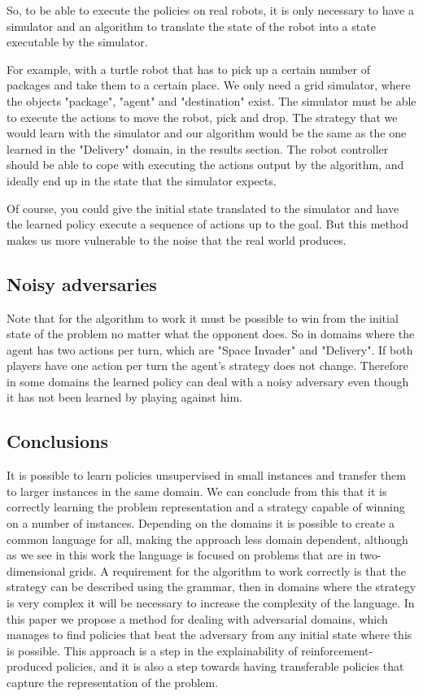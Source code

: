 \documentclass[a4paper]{article}
\begin{document}
So, to be able to execute the policies on real robots, it is only necessary to have a simulator and an algorithm to translate the state of the robot into a state executable by the simulator.

For example, with a turtle robot that has to pick up a certain number of packages and take them to a certain place. We only need a grid simulator, where the objects "package", "agent" and "destination" exist. The simulator must be able to execute the actions to move the robot, pick and drop. The strategy that we would learn with the simulator and our algorithm would be the same as the one learned in the "Delivery" domain, in the results section. The robot controller should be able to cope with executing the actions output by the algorithm, and ideally end up in the state that the simulator expects.

Of course, you could give the initial state translated to the simulator and have the learned policy execute a sequence of actions up to the goal. But this method makes us more vulnerable to the noise that the real world produces.

\subsection{Noisy adversaries}

Note that for the algorithm to work it must be possible to win from the initial state of the problem no matter what the opponent does. So in domains where the agent has two actions per turn, which are "Space Invader" and "Delivery". If both players have one action per turn the agent's strategy does not change. Therefore in some domains the learned policy can deal with a noisy adversary even though it has not been learned by playing against him.

\subsection{Conclusions}

It is possible to learn policies unsupervised in small instances and transfer them to larger instances in the same domain. We can conclude from this that it is correctly learning the problem representation and a strategy capable of winning on a number of instances. Depending on the domains it is possible to create a common language for all, making the approach less domain dependent, although as we see in this work the language is focused on problems that are in two-dimensional grids. A requirement for the algorithm to work correctly is that the strategy can be described using the grammar, then in domains where the strategy is very complex it will be necessary to increase the complexity of the language. In this paper we propose a method for dealing with adversarial domains, which manages to find policies that beat the adversary from any initial state where this is possible. This approach is a step in the explainability of reinforcement-produced policies, and it is also a step towards having transferable policies that capture the representation of the problem.
\end{document}
